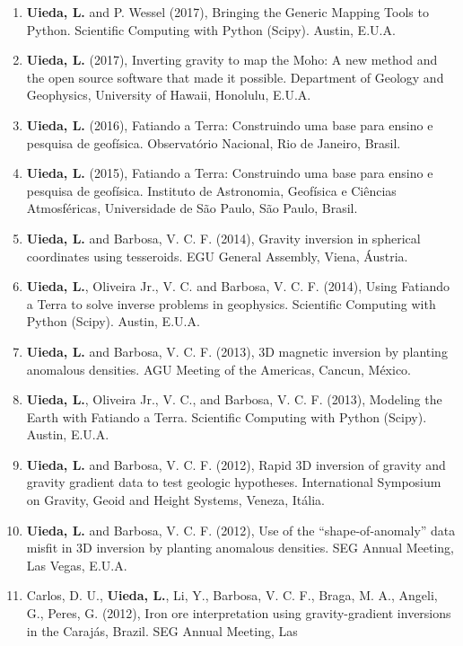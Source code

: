 \documentclass[12pt,a4paper,oneside,titlepage,onecolumn]{article}
\begin{document}
\begin{enumerate}
\item \textbf{Uieda, L.} and P. Wessel (2017), Bringing the Generic Mapping
    Tools to Python. Scientific Computing with Python (Scipy). Austin, E.U.A.
\item \textbf{Uieda, L.} (2017), Inverting gravity to map the Moho: A new
    method and the open source software that made it possible. Department of
    Geology and Geophysics, University of Hawaii, Honolulu, E.U.A.
\item \textbf{Uieda, L.} (2016), Fatiando a Terra: Construindo uma base para
    ensino e pesquisa de geofísica. Observatório Nacional, Rio de Janeiro,
    Brasil.
\item \textbf{Uieda, L.} (2015), Fatiando a Terra: Construindo uma base para
    ensino e pesquisa de geofísica. Instituto de Astronomia, Geofísica e
    Ciências Atmosféricas, Universidade de São Paulo, São Paulo, Brasil.
\item \textbf{Uieda, L.} and Barbosa, V. C. F. (2014), Gravity inversion in
    spherical coordinates using tesseroids. EGU General Assembly, Viena,
    Áustria.
\item \textbf{Uieda, L.}, Oliveira Jr., V. C. and Barbosa, V. C. F.  (2014),
    Using Fatiando a Terra to solve inverse problems in geophysics. Scientific
    Computing with Python (Scipy). Austin, E.U.A.
\item \textbf{Uieda, L.} and Barbosa, V. C. F. (2013), 3D magnetic inversion by
    planting anomalous densities. AGU Meeting of the Americas, Cancun, México.
\item \textbf{Uieda, L.}, Oliveira Jr., V. C., and Barbosa, V. C. F.  (2013),
    Modeling the Earth with Fatiando a Terra. Scientific Computing with Python
    (Scipy). Austin, E.U.A.
\item \textbf{Uieda, L.} and Barbosa, V. C. F. (2012), Rapid 3D inversion of
    gravity and gravity gradient data to test geologic hypotheses.
    International Symposium on Gravity, Geoid and Height Systems, Veneza,
    Itália.
\item \textbf{Uieda, L.} and Barbosa, V. C. F. (2012), Use of the
    ``shape-of-anomaly'' data misfit in 3D inversion by planting anomalous
    densities. SEG Annual Meeting, Las Vegas, E.U.A.
\item Carlos, D. U., \textbf{Uieda, L.}, Li, Y., Barbosa, V. C. F., Braga, M.
    A., Angeli, G., Peres, G. (2012), Iron ore interpretation using
    gravity-gradient inversions in the Carajás, Brazil. SEG Annual Meeting, Las

\end{enumerate}
\end{document}
